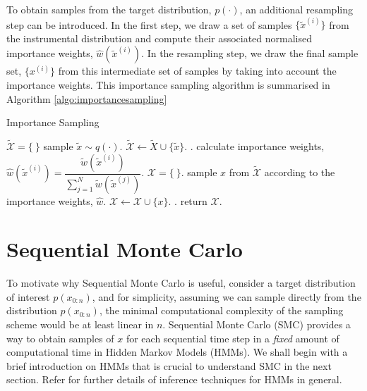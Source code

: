 To obtain samples from the target distribution, $p(\cdot)$, an additional resampling step can be introduced. In the first step, we draw a set of samples $\{\tilde{x}^{(i)}\}$ from the instrumental distribution and compute their associated normalised importance weights, $\hat{w}(\tilde{x}^{(i)})$. In the resampling step, we draw the final sample set, $\{x^{(i)}\}$ from this intermediate set of samples by taking into account the importance weights. This importance sampling algorithm is summarised in Algorithm \ref{algo:importancesampling}

\begin{algorithm}
\caption{Importance Sampling}\label{algo:importancesampling}
\begin{algorithmic}[1]
\State $\tilde{\mathcal{X}} = \{\ \}$
\Repeat
  \State sample $\tilde{x} \sim q(\cdot)$.
  \State $\tilde{\mathcal{X}} \gets \tilde{X} \cup \{\tilde{x}\}$.
.
\State calculate importance weights, $\hat{w}(\tilde{x}^{(i)})  = \dfrac{\tilde{w}(\tilde{x}^{(i)})}{\sum^N_{j=1} \tilde{w}(\tilde{x}^{(j)})}$.
\State $\mathcal{X} = \{\ \}$.
\Repeat
  \State sample $x$ from $\tilde{\mathcal{X}}$ according to the importance weights, $\hat{w}$.
  \State $\mathcal{X} \gets \mathcal{X} \cup \{x\}$.
.
\State return $\mathcal{X}$.
\EndFunction
\end{algorithmic}
\end{algorithm}

\section{Sequential Monte Carlo}
\label{sec:SMC}
To motivate why Sequential Monte Carlo is useful, consider a target distribution of interest $p(x_{0:n})$, and for simplicity, assuming we can sample directly from the distribution $p(x_{0:n})$, the minimal computational complexity of the sampling scheme would be at least linear in $n$. Sequential Monte Carlo (SMC) provides a way to obtain samples of $x$ for each sequential time step in a \emph{fixed} amount of computational time in Hidden Markov Models (HMMs). We shall begin with a brief introduction on HMMs that is crucial to understand SMC in the next section. Refer \cite{CO05} for further details of inference techniques for HMMs in general. 

